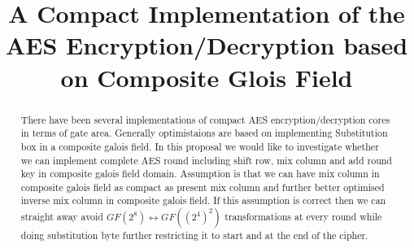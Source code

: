 \documentclass[10pt, conference, compsocconf]{IEEEtran}
\begin{document}
\title{A Compact Implementation of the AES Encryption/Decryption based on Composite Glois Field}



\author{
\and
\IEEEauthorblockN{
}
}


\maketitle



\begin{abstract}
There have been several implementations of compact AES encryption/decryption cores in terms of gate area. Generally optimistaions are based on implementing Substitution box in a composite galois field. In this proposal we would like to investigate whether we can implement complete AES round including shift row, mix column and add round key in composite galois field domain. Assumption is that we can have mix column in composite galois field as compact as present mix column and further better optimised inverse mix column in composite galois field. If this assumption is correct then we can straight away avoid $GF(2^8) \leftrightarrow GF((2^4)^2)$ transformations at every round while doing substitution byte further restricting it to start and at the end of the cipher.

\end{abstract}
\end{document}
